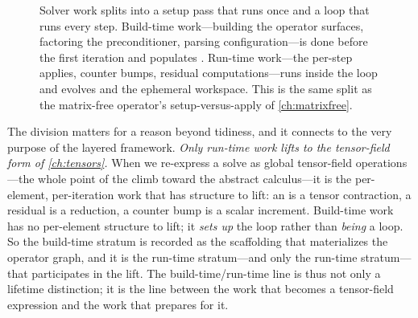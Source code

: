 \begin{figure}[t]
\centering
{}
\caption[The build-time / run-time timeline]{Solver work splits into a setup
pass that runs once and a loop that runs every step. Build-time work---building
the operator surfaces, factoring the preconditioner, parsing configuration---is
done before the first iteration and populates . Run-time
work---the per-step applies, counter bumps, residual computations---runs inside
the loop and evolves  and the ephemeral workspace. This is the
same split as the matrix-free operator's setup-versus-apply of
\cref{ch:matrixfree}.}
\label{fig:buildrun}
\end{figure}

The division matters for a reason beyond tidiness, and it connects to the very
purpose of the layered framework. \emph{Only run-time work lifts to the
tensor-field form of \cref{ch:tensors}.} When we re-express a solve as global
tensor-field operations---the whole point of the climb toward the abstract
calculus---it is the per-element, per-iteration work that has structure to lift:
an  is a tensor contraction, a residual is a reduction, a counter
bump is a scalar increment. Build-time work has no per-element structure to lift;
it \emph{sets up} the loop rather than \emph{being} a loop. So the build-time
stratum is recorded as the scaffolding that materializes the operator graph, and
it is the run-time stratum---and only the run-time stratum---that participates in
the lift. The build-time/run-time line is thus not only a lifetime distinction;
it is the line between the work that becomes a tensor-field expression and the
work that prepares for it.

